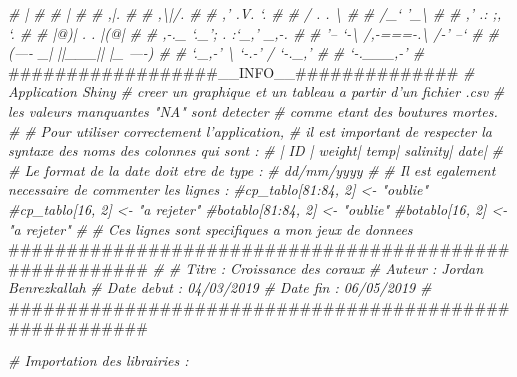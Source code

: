 \documentclass[]{report}
\newenvironment{Shaded}{\begin{snugshade}}{\end{snugshade}}
\newcommand{\CommentTok}[1]{\textcolor[rgb]{0.56,0.35,0.01}{\textit{#1}}}
\newcommand{\NormalTok}[1]{#1}
\begin{document}
\begin{Shaded}
\begin{Highlighting}[]
\CommentTok{#                 |                                        #}
\CommentTok{#                 |                                        #}
\CommentTok{#                ,|.                                       #}
\CommentTok{#               ,\textbackslash{}|/.                                      #}
\CommentTok{#             ,' .V. `.                                    #}
\CommentTok{#            / .     . \textbackslash{}                                   #}
\CommentTok{#           /_`       '_\textbackslash{}                                  #}
\CommentTok{#          ,' .:     ;, `.                                 #}
\CommentTok{#          |@)|  . .  |(@|                                 #}
\CommentTok{#     ,-._ `._';  .  :`_,' _,-.                            #}
\CommentTok{#    '--  `-\textbackslash{} /,-===-.\textbackslash{} /-'  --`                           #}
\CommentTok{#   (----  _|  ||___||  |_  ----)                          #}
\CommentTok{#    `._,-'  \textbackslash{}  `-.-'  /  `-._,'                           #}
\CommentTok{#             `-.___,-'                                    #}
\NormalTok{##################__INFO__##############}
\CommentTok{# Application Shiny}
\CommentTok{# creer un graphique et un tableau a partir d'un fichier .csv}
\CommentTok{# les valeurs manquantes "NA" sont detecter}
\CommentTok{#  comme etant des boutures mortes.}
\CommentTok{#}
\CommentTok{# Pour utiliser correctement l'application,}
\CommentTok{# il est important de respecter la syntaxe des noms des colonnes qui sont :}
\CommentTok{# |     ID |     weight|     temp|    salinity|     date|}
\CommentTok{#}
\CommentTok{# Le format de la date doit etre de type :}
\CommentTok{# dd/mm/yyyy}
\CommentTok{#}
\CommentTok{# Il est egalement necessaire de commenter les lignes :}
\CommentTok{#cp_tablo[81:84, 2] <- "oublie"}
\CommentTok{#cp_tablo[16, 2] <- "a rejeter"}
\CommentTok{#botablo[81:84, 2] <- "oublie"}
\CommentTok{#botablo[16, 2] <- "a rejeter"}
\CommentTok{#}
\CommentTok{# Ces lignes sont specifiques a mon jeux de donnees}
\NormalTok{#######################################################}
\CommentTok{#}
\CommentTok{# Titre  : Croissance des coraux}
\CommentTok{# Auteur : Jordan Benrezkallah}
\CommentTok{# Date debut : 04/03/2019}
\CommentTok{# Date fin : 06/05/2019}
\CommentTok{#}
\NormalTok{#######################################################}

\CommentTok{# Importation des librairies :}


\end{Highlighting}
\end{Shaded}
\end{document}

